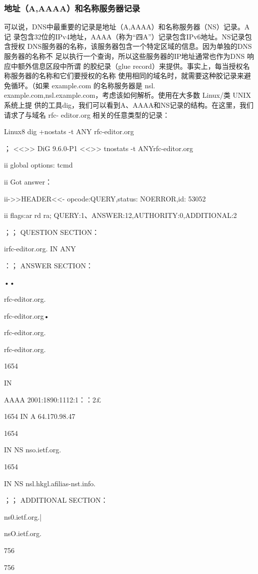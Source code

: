 \subsubsection{地址（A,AAAA）和名称服务器记录}

可以说，DNS中最重要的记录是地址（A,AAAA）和名称服务器（NS）记录。A记
录包含32位的IPv4地址，AAAA（称为“四A”）记录包含IPv6地址。NS记录包含授权
DNS服务器的名称，该服务器包含一个特定区域的信息。因为单独的DNS服务器的名称不
足以执行一个查询，所以这些服务器的IP地址通常也作为DNS 响应中额外信息区段中所谓
的胶纪录（glue record）来提供。事实上，每当授权名称服务器的名称和它们要授权的名称
使用相同的域名时，就需要这种胶记录来避免循环。（如果 example.com 的名称服务器是 nsl.
example.com,nsl.example.com，考虑该如何解析。使用在大多数 Linux/类 UNIX 系统上提
供的工具dig，我们可以看到A、AAAA和NS记录的结构。在这里，我们请求了与域名 rfc-
editor.org 相关的任意类型的记录：

Linux8 dig +nostats -t ANY rfc-editor.org

； <<>> DiG 9.6.0-P1 <<>> tnostats -t ANYrfc-editor.org

ii global options: tcmd

ii Got answer：

ii->>HEADER<<- opcode:QUERY,status: NOERROR,id: 53052

ii flags:ar rd ra; QUERY:1、ANSWER:12,AUTHORITY:0,ADDITIONAL:2

；； QUESTION SECTION：

irfc-editor.org. IN ANY

：； ANSWER SECTION：

••

rfc-editor.org.

rfc-editor.org•

rfc-editor.org.

rfc-editor.org.

1654

IN

AAAA 2001:1890:1112:1：：2£

1654 IN A 64.170.98.47

1654

IN NS nso.ietf.org.

1654

IN NS nsl.hkgl.afilias-nst.info.

；； ADDITIONAL SECTION：

ns0.ietf.org.|

nsO.ietf.org.

756

756

